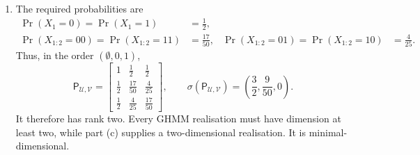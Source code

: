 \begin{solution}[ex:p3-4]
\begin{enumerate}
\begin{enumerate}
          \item The required probabilities are
            \[
              \begin{aligned}
                \Pr(X_1=0)=\Pr(X_1=1)&=\frac12,\\
                \Pr(X_{1:2}=00)=\Pr(X_{1:2}=11)&=\frac{17}{50},&
                \Pr(X_{1:2}=01)=\Pr(X_{1:2}=10)&=\frac4{25}.
              \end{aligned}
            \]
            Thus, in the order $(\emptyset,0,1)$,
            \[
              \mathsf P_{\mathcal U,\mathcal V}
                =
                \begin{bmatrix}
                  1&\tfrac12&\tfrac12\\
                  \tfrac12&\tfrac{17}{50}&\tfrac4{25}\\
                  \tfrac12&\tfrac4{25}&\tfrac{17}{50}
                \end{bmatrix},
              \qquad
              \sigma(\mathsf P_{\mathcal U,\mathcal V})
                =\left(\frac32,\frac9{50},0\right).
            \]
            It therefore has rank two. Every GHMM realisation must have
            dimension at least two, while part (c) supplies a
            two-dimensional realisation. It is minimal-dimensional.
        \end{enumerate}

    \end{enumerate}
\end{solution}
